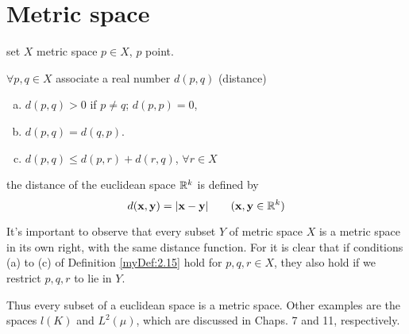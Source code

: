 \section{Metric space}
\begin{myDef}\label{myDef:2.15}
    set $X$ metric space $p\in X$, $p$ point.

    $\forall p,q \in X$ associate a real number $d(p,q)$ (distance)
    \begin{enumerate}[a.]
        \item $d(p,q) > 0$ if $p \neq q$; $d(p,p)=0$,
        \item $d(p,q) = d(q,p)$.
        \item $d(p,q) \leq d(p,r) + d(r,q)$, $\forall r\in X$
    \end{enumerate}
\end{myDef}

\begin{myExample}
    the distance of the euclidean space ${\protect\mathbb R}^k$ is defined by
    \begin{equation}\label{eq:2.19}
        d(\mathbf{x}, \mathbf{y}) = |\mathbf{x} - \mathbf{y}|
        \qquad (\mathbf{x}, \mathbf{y}\in {\protect\mathbb R}^k)
    \end{equation}
\end{myExample}

It's important to observe that every subset $Y$ of metric space $X$ is a metric space in its own right, with the same distance function. For it is clear that if conditions (a) to (c) of Definition \ref{myDef:2.15} hold for $p, q, r \in X$, they also hold if we restrict $p, q, r$ to lie in $Y$.

Thus every subset of a euclidean space is a metric space. Other examples
are the spaces $l(K)$ and $L^2 (\mu)$, 
which are discussed in Chaps. 7 and 11, respectively.



